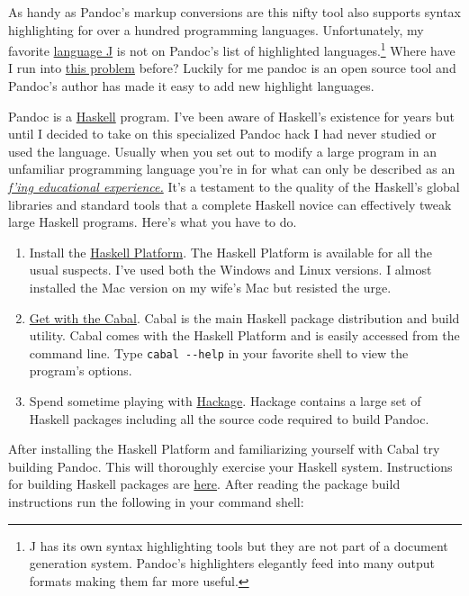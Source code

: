 As handy as Pandoc's markup conversions are this nifty tool also
supports syntax highlighting for over a hundred programming languages.
Unfortunately, my favorite \href{http://www.jsoftware.com/}{language J}
is not on Pandoc's list of highlighted languages.\footnote{
J has its own syntax highlighting tools but they are not part of a
document generation system. Pandoc's highlighters elegantly feed into
many output formats making them far more useful.
} Where have I run 
into \href{http://bakerjd99.wordpress.com/2010/11/12/the-return-of-apl-fingers-2/}{this problem} before? Luckily for me pandoc is an open source tool and Pandoc's author has made it easy to add new highlight
languages.

Pandoc is a \href{http://www.haskell.org/haskellwiki/Haskell}{Haskell}
program. I've been aware of Haskell's existence for years but until I
decided to take on this specialized Pandoc hack I had never studied or
used the language. Usually when you set out to modify a large program in
an unfamiliar programming language you're in for what can only be
described as an \href{http://www.ebaumsworld.com/video/watch/81394604/}{\emph{f'ing educational experience.}} It's a testament to
the quality of the Haskell's global libraries and standard tools that a
complete Haskell novice can effectively tweak large Haskell programs.
Here's what you have to do.

\begin{enumerate}
\item
  Install the
  \href{http://hackage.haskell.org/platform/index.html}{Haskell
  Platform}. The Haskell Platform is available for all the usual
  suspects. I've used both the Windows and Linux versions. I almost
  installed the Mac version on my wife's Mac but resisted the urge.
\item
  \href{http://www.haskell.org/cabal/}{Get with the Cabal}. Cabal is the
  main Haskell package distribution and build utility. Cabal comes with
  the Haskell Platform and is easily accessed from the command line.
  Type \texttt{cabal -{}-help} in your favorite shell to view the
  program's options.
\item
  Spend sometime playing with
  \href{http://hackage.haskell.org/packages/hackage.html}{Hackage}.
  Hackage contains a large set of Haskell packages including all the
  source code required to build Pandoc.
\end{enumerate}

After installing the Haskell Platform and familiarizing yourself with
Cabal try building Pandoc. This will thoroughly exercise your Haskell
system. Instructions for building Haskell packages are
\href{http://www.haskell.org/haskellwiki/Cabal-Install}{here}. After
reading the package build instructions run the following in your command
shell:

